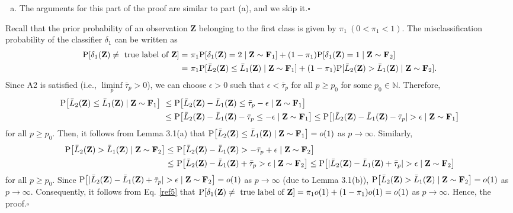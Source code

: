 \documentclass[twoside]{article}
\newcommand{\bZ}{\mathbf{Z}}
\newcommand{\bF}{\mathbf{F}}
\newcommand{\0}{\mathbf{0}}
\newcommand{\1}{\mathbf{1}}
\newcommand*{\QEDB}{\hfill\ensuremath{\square}}
\numberwithin{equation}{section}
\begin{document}
\begin{enumerate}[(a)]
\item The arguments for this part of the proof are similar to part (a), and we skip it.\hfill\QEDB\newline
\end{enumerate}

Recall that the prior probability of an observation $\bZ$ belonging to the first class is given by $\pi_1\ (0<\pi_1<1)$. The misclassification probability of the classifier $\delta_1$ can be written as
\begin{align}\label{ref5}
 {\rm P}[\delta_1(\bZ)\neq \text{ true label of }\bZ]
 =&\ \pi_1 {\rm P}[\delta_1(\bZ)=2\mid \bZ\sim\bF_1] + (1-\pi_1){\rm P}[\delta_1(\bZ)=1\mid \bZ\sim\bF_2]\nonumber \\
 =&\ \pi_1 {\rm P}[\bar{L}_2(\bZ)\leq \bar{L}_1(\bZ)\mid \bZ\sim\bF_1]+ (1-\pi_1){\rm P}[\bar{L}_2(\bZ)> \bar{L}_1(\bZ)\mid \bZ\sim\bF_2].
\end{align}
Since A2 is satisfied (i.e., $\liminf\limits_{p}\bar{\tau}_p>0$), we can choose $\epsilon>0 $ such that $\epsilon <\bar{\tau}_p$ for all $p\geq p_0$ for some $p_0\in\mathbb{N}.$ Therefore,
\begin{align*}
{\rm P}\big [\bar{L}_2(\bZ)\leq \bar{L}_1(\bZ)\mid \bZ\sim\bF_1\big ]
&\ \leq {\rm P}\big [\bar{L}_2(\bZ)- \bar{L}_1(\bZ)\leq \bar{\tau}_p-\epsilon\mid \bZ\sim\bF_1\big ]\\
&\ \leq {\rm P}\big [\bar{L}_2(\bZ)- \bar{L}_1(\bZ)- \bar{\tau}_p \leq -\epsilon\mid \bZ\sim\bF_1\big ]
\leq {\rm P}\big [|\bar{L}_2(\bZ)- \bar{L}_1(\bZ) - \bar{\tau}_p|>\epsilon\mid \bZ\sim\bF_1\big ]
\end{align*}
for all $p\geq p_0$. Then, it follows from Lemma 3.1(a) that ${\rm P}\big [\bar{L}_2(\bZ)\leq \bar{L}_1(\bZ)\mid \bZ\sim\bF_1\big ]=o(1)$ as $p\to\infty$.
Similarly,
\begin{align*}
{\rm P}\big [\bar{L}_2(\bZ)> \bar{L}_1(\bZ)\mid \bZ\sim\bF_2\big ]
\leq &\ {\rm P}\big [\bar{L}_2(\bZ)- \bar{L}_1(\bZ)> -\bar{\tau}_p+\epsilon\mid \bZ\sim\bF_2\big ]\\
\leq &\ {\rm P}\big [\bar{L}_2(\bZ)- \bar{L}_1(\bZ)+ \bar{\tau}_p > \epsilon\mid \bZ\sim\bF_2\big ]
\leq {\rm P}\big [|\bar{L}_2(\bZ)- \bar{L}_1(\bZ) + \bar{\tau}_p|>\epsilon\mid \bZ\sim\bF_2\big ]
\end{align*}
for all $p\geq p_0$. Since ${\rm P}\big [|\bar{L}_2(\bZ)- \bar{L}_1(\bZ) + \bar{\tau}_p|>\epsilon\mid \bZ\sim\bF_2\big ]=o(1)$ as $p\to\infty$ (due to Lemma 3.1(b)), ${\rm P}\big [\bar{L}_2(\bZ)> \bar{L}_1(\bZ)\mid \bZ\sim\bF_2\big ]=o(1)$ as $p\to\infty$. Consequently, it follows from Eq. \eqref{ref5} that ${\rm P}[\delta_1(\bZ)\neq \text{ true label of }\bZ]=\pi_1 o(1) + (1-\pi_1)o(1)=o(1)$ as $p\to\infty$. Hence, the proof.\hfill\QEDB\newline
\end{document}
